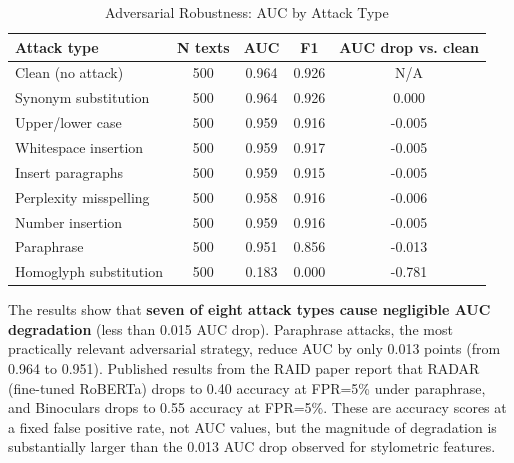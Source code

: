 \documentclass{article}
\begin{document}
\begin{table}[H]
\centering
\small
\begin{tabular}{lcccc}
\toprule
\textbf{Attack type} & \textbf{N texts} & \textbf{AUC} & \textbf{F1} & \textbf{AUC drop vs. clean} \\
\midrule
Clean (no attack) & 500 & 0.964 & 0.926 & N/A \\
Synonym substitution & 500 & 0.964 & 0.926 & 0.000 \\
Upper/lower case & 500 & 0.959 & 0.916 & -0.005 \\
Whitespace insertion & 500 & 0.959 & 0.917 & -0.005 \\
Insert paragraphs & 500 & 0.959 & 0.915 & -0.005 \\
Perplexity misspelling & 500 & 0.958 & 0.916 & -0.006 \\
Number insertion & 500 & 0.959 & 0.916 & -0.005 \\
Paraphrase & 500 & 0.951 & 0.856 & -0.013 \\
Homoglyph substitution & 500 & 0.183 & 0.000 & -0.781 \\
\bottomrule
\end{tabular}
\caption{Adversarial Robustness: AUC by Attack Type}
\end{table}

The results show that \textbf{seven of eight attack types cause negligible AUC degradation} (less than 0.015 AUC drop). Paraphrase attacks, the most practically relevant adversarial strategy, reduce AUC by only 0.013 points (from 0.964 to 0.951). Published results from the RAID paper \cite{ref4} report that RADAR (fine-tuned RoBERTa) drops to 0.40 accuracy at FPR=5\% under paraphrase, and Binoculars drops to 0.55 accuracy at FPR=5\%. These are accuracy scores at a fixed false positive rate, not AUC values, but the magnitude of degradation is substantially larger than the 0.013 AUC drop observed for stylometric features.
\end{document}
